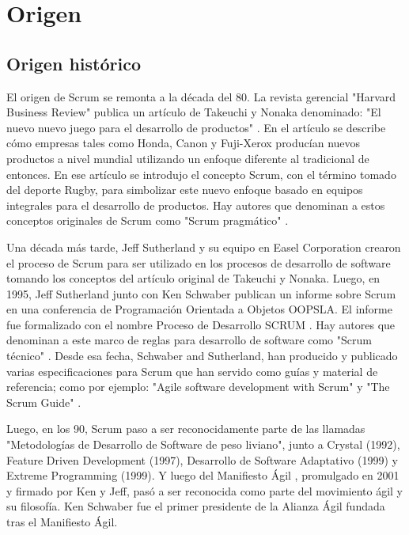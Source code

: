 \chapter{Origen}

\section{Origen histórico}

El origen de Scrum se remonta a la década del 80. La revista gerencial "Harvard Business Review" publica un artículo de Takeuchi y Nonaka denominado: "El nuevo nuevo juego para el desarrollo de productos" \cite{Takeuchi-Nonaka-1986}. En el artículo se describe cómo empresas tales como Honda, Canon y Fuji-Xerox producían nuevos productos a nivel mundial utilizando un enfoque diferente al tradicional de entonces. En ese artículo se introdujo el concepto Scrum, con el término tomado del deporte Rugby, para simbolizar este nuevo enfoque basado en equipos integrales para el desarrollo de productos. Hay autores que denominan a estos conceptos originales de Scrum como "Scrum pragmático" \cite{ScrumManager-2014}.

Una década más tarde, Jeff Sutherland y su equipo en Easel Corporation crearon el proceso de Scrum para ser utilizado en los procesos de 
desarrollo de software tomando los conceptos del artículo original de Takeuchi y Nonaka. Luego, en 1995, Jeff Sutherland junto con Ken Schwaber publican un informe sobre Scrum en una conferencia de Programación Orientada a Objetos OOPSLA. El informe fue formalizado con el nombre Proceso de Desarrollo SCRUM \cite{Ken-Schwaber-1995}. Hay autores que denominan a este marco de reglas para desarrollo de software como "Scrum técnico" \cite{ScrumManager-2014}. Desde esa fecha, Schwaber and Sutherland, han producido y publicado varias especificaciones para Scrum que han servido como guías y material de referencia; como por ejemplo: "Agile software development with Scrum" \cite{Ken-Schwaber-2002} y "The Scrum Guide" \cite{Ken-Jeff-2013}.

Luego, en los 90, Scrum paso a ser reconocidamente parte de las llamadas "Metodologías de Desarrollo de Software de peso liviano", junto a Crystal (1992), Feature Driven Development (1997), Desarrollo de Software Adaptativo (1999) y Extreme Programming (1999). Y luego del Manifiesto Ágil \cite{Beck-2001}, promulgado en 2001 y firmado por Ken y Jeff, pasó a ser reconocida como parte del movimiento ágil y su filosofía. Ken Schwaber fue el primer presidente de la Alianza Ágil fundada tras el Manifiesto Ágil.

